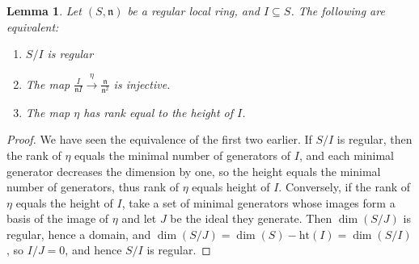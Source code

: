 \documentclass{amsart}[12pt]
\newcommand{\htt}{\mathrm{ht}}
\newcommand{\fn}{{\mathfrak n}}
\numberwithin{equation}{section}
\theoremstyle{plain} %
\newtheorem{lem}[equation]{Lemma}
\theoremstyle{definition}
\theoremstyle{remark}
\newcommand{\xra}[1]{\xrightarrow{#1}}
\begin{document}
\begin{lem} Let $(S,\fn)$ be a regular local ring, and $I\subseteq S$. The following are equivalent:
\begin{enumerate}
\item $S/I$ is regular
\item The map $\frac{I}{\fn I} \xra{\eta} \frac{\fn}{\fn^2}$ is injective.
\item The map $\eta$ has rank equal to the height of $I$.
\end{enumerate}
\end{lem}
\begin{proof}
We have seen the equivalence of the first two earlier. If $S/I$ is regular, then the rank of $\eta$ equals the minimal number of generators of $I$, and each minimal generator decreases the dimension by one, so the height equals the minimal number of generators, thus rank of $\eta$ equals height of $I$.  Conversely, if the rank of $\eta$ equals the height of $I$, take a set of minimal generators whose images form a basis of the image of $\eta$ and let $J$ be the ideal they generate. Then $\dim(S/J)$ is regular, hence a domain, and $\dim(S/J)=\dim(S) - \htt(I) = \dim(S/I)$, so $I/J=0$, and hence $S/I$ is regular.
\end{proof}
\end{document}
